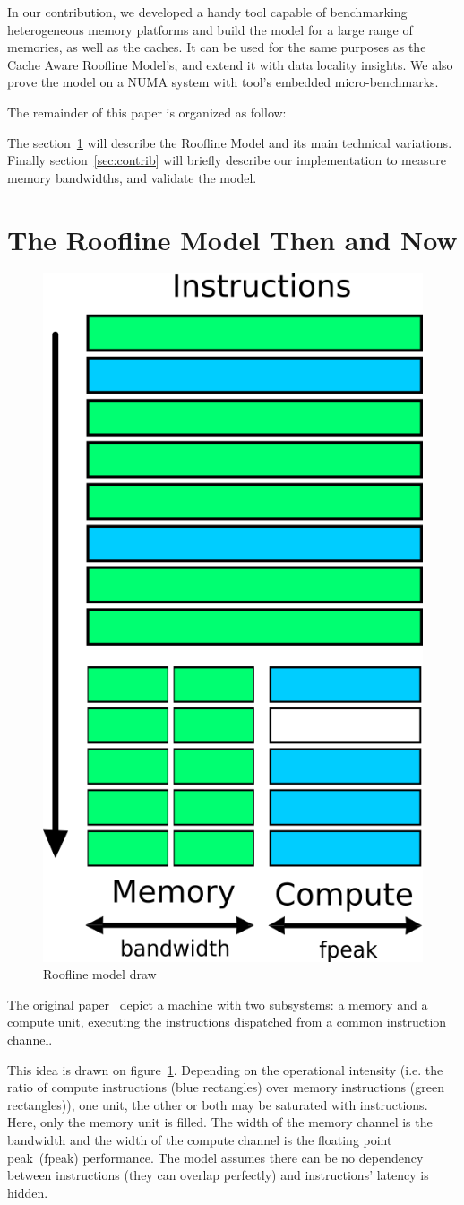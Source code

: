 \documentclass[twoside,twocolumn,8pt]{extarticle}
\begin{document}
In our contribution, we developed a handy tool capable of benchmarking heterogeneous memory platforms and build the model for a
large range of memories, as well as the caches.
It can be used for the same purposes as the Cache Aware Roofline Model's, and extend it with data locality insights.
We also prove the model on a NUMA system with tool's embedded micro-benchmarks.

The remainder of this paper is organized as follow:

The section~\ref{sec:state_of_art} will describe the Roofline Model and its main technical variations.
Finally section~\ref{sec:contrib} will briefly describe our implementation to measure memory bandwidths, and validate the model.

\section{The Roofline Model Then and Now}\label{sec:state_of_art}
\begin{figure}
  \centering
  \includegraphics[width=.2\textwidth]{pictures/model_drawing}
  \caption{Roofline model draw}
  \label{fig:roofline_draw}
\end{figure}

The original paper~\cite{Williams:2009:RIV:1498765.1498785} depict a machine with two subsystems: a memory and a compute unit,
executing the instructions dispatched from a common instruction channel.

This idea is drawn on figure~\ref{fig:roofline_draw}.
Depending on the operational intensity (i.e. the ratio of compute instructions (blue rectangles) over memory instructions (green
rectangles)), one unit, the other or both may be saturated with instructions. Here, only the memory unit is filled. 
The width of the memory channel is the bandwidth and the width of the compute channel is the floating point peak~(fpeak)
performance.
The model assumes there can be no dependency between instructions (they can overlap perfectly) and instructions' latency is
hidden.
\end{document}
